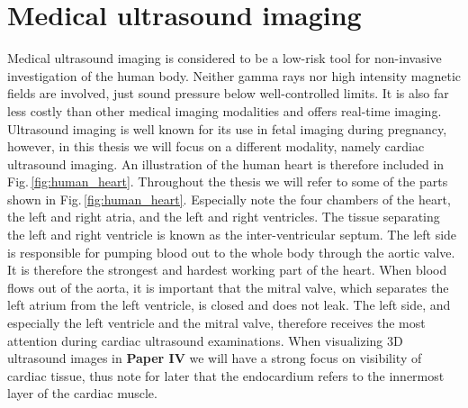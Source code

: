 \section {Medical ultrasound imaging}\label{sec:ultrasound}
Medical ultrasound imaging is considered to be a low-risk tool for non-invasive investigation of the human body. Neither gamma rays nor high intensity magnetic fields are involved, just sound pressure below well-controlled limits. It is also far less costly than other medical imaging modalities and offers real-time imaging. Ultrasound imaging is well known for its use in fetal imaging during pregnancy, however, in this thesis we will focus on a different modality, namely cardiac ultrasound imaging. An illustration of the human heart is therefore included in Fig.\,\ref{fig:human_heart}. Throughout the thesis we will refer to some of the parts shown in Fig.\,\ref{fig:human_heart}. Especially note the four chambers of the heart, the left and right atria, and the left and right ventricles. The tissue separating the left and right ventricle is known as the inter-ventricular septum. The left side is responsible for pumping blood out to the whole body through the aortic valve. It is therefore the strongest and hardest working part of the heart. When blood flows out of the aorta, it is important that the mitral valve, which separates the left atrium from the left ventricle, is closed and does not leak. The left side, and especially the left ventricle and the mitral valve, therefore receives the most attention during cardiac ultrasound examinations. When visualizing 3D ultrasound images in \textbf{Paper IV} we will have a strong focus on visibility of cardiac tissue, thus note for later that the endocardium refers to the innermost layer of the cardiac muscle.

